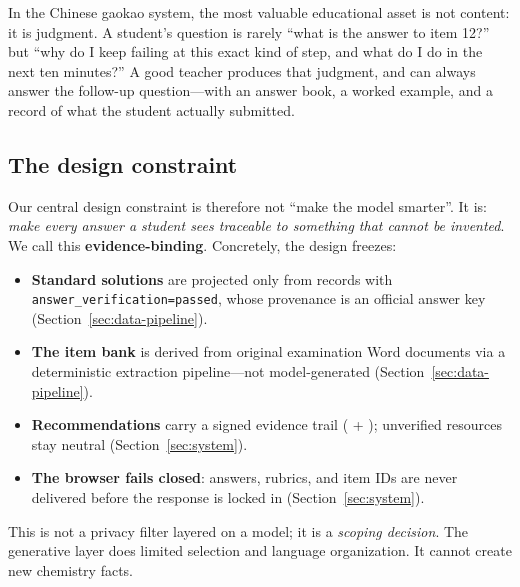\documentclass[11pt]{article}
\begin{document}
In the Chinese gaokao system, the most valuable educational asset is not content: it is judgment. A student's question is rarely ``what is the answer to item 12?'' but ``why do I keep failing at this exact kind of step, and what do I do in the next ten minutes?'' A good teacher produces that judgment, and can always answer the follow-up question---with an answer book, a worked example, and a record of what the student actually submitted.

\subsection{The design constraint}
Our central design constraint is therefore not ``make the model smarter''. It is: \emph{make every answer a student sees traceable to something that cannot be invented}. We call this \textbf{evidence-binding}. Concretely, the design freezes:

\begin{itemize}\setlength{\itemsep}{0pt}\setlength{\parskip}{0pt}\setlength{\parsep}{0pt}
\item \textbf{Standard solutions} are projected only from records with \texttt{answer\_verification=passed}, whose provenance is an official answer key (Section~\ref{sec:data-pipeline}).
\item \textbf{The item bank} is derived from original examination Word documents via a deterministic extraction pipeline---not model-generated (Section~\ref{sec:data-pipeline}).
\item \textbf{Recommendations} carry a signed evidence trail ( + ); unverified resources stay neutral (Section~\ref{sec:system}).
\item \textbf{The browser fails closed}: answers, rubrics, and item IDs are never delivered before the response is locked in (Section~\ref{sec:system}).
\end{itemize}

This is not a privacy filter layered on a model; it is a \emph{scoping decision}. The generative layer does limited selection and language organization. It cannot create new chemistry facts.
\end{document}

